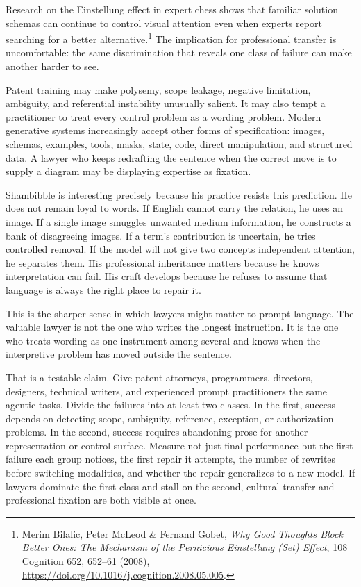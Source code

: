 \documentclass[11pt]{article}
\begin{document}
Research on the Einstellung effect in expert chess shows that familiar solution schemas can continue to control visual attention even when experts report searching for a better alternative.\footnote{Merim Bilalic, Peter McLeod \& Fernand Gobet, \textit{Why Good Thoughts Block Better Ones: The Mechanism of the Pernicious Einstellung (Set) Effect}, 108 Cognition 652, 652--61 (2008), \url{https://doi.org/10.1016/j.cognition.2008.05.005}.} The implication for professional transfer is uncomfortable: the same discrimination that reveals one class of failure can make another harder to see.

Patent training may make polysemy, scope leakage, negative limitation, ambiguity, and referential instability unusually salient. It may also tempt a practitioner to treat every control problem as a wording problem. Modern generative systems increasingly accept other forms of specification: images, schemas, examples, tools, masks, state, code, direct manipulation, and structured data. A lawyer who keeps redrafting the sentence when the correct move is to supply a diagram may be displaying expertise as fixation.

Shambibble is interesting precisely because his practice resists this prediction. He does not remain loyal to words. If English cannot carry the relation, he uses an image. If a single image smuggles unwanted medium information, he constructs a bank of disagreeing images. If a term's contribution is uncertain, he tries controlled removal. If the model will not give two concepts independent attention, he separates them. His professional inheritance matters because he knows interpretation can fail. His craft develops because he refuses to assume that language is always the right place to repair it.

This is the sharper sense in which lawyers might matter to prompt language. The valuable lawyer is not the one who writes the longest instruction. It is the one who treats wording as one instrument among several and knows when the interpretive problem has moved outside the sentence.

That is a testable claim. Give patent attorneys, programmers, directors, designers, technical writers, and experienced prompt practitioners the same agentic tasks. Divide the failures into at least two classes. In the first, success depends on detecting scope, ambiguity, reference, exception, or authorization problems. In the second, success requires abandoning prose for another representation or control surface. Measure not just final performance but the first failure each group notices, the first repair it attempts, the number of rewrites before switching modalities, and whether the repair generalizes to a new model. If lawyers dominate the first class and stall on the second, cultural transfer and professional fixation are both visible at once.
\end{document}
